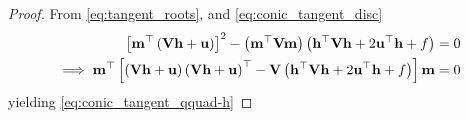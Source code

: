 \documentclass[journal,12pt,onecolumn]{IEEEtran}
\begin{document}
\begin{proof}
 From \eqref{eq:tangent_roots},
 and
  \eqref{eq:conic_tangent_disc}
  \begin{align}
  {}\left[
  \mathbf{m}^{\top}\left(\mathbf{V}\mathbf{h}+\mathbf{u}\right)
  \right]^2 -\left(\mathbf{m}^{\top}\mathbf{V}\mathbf{m}\right)
  \left(
  \mathbf{h}^{\top}\mathbf{V}\mathbf{h} + 2\mathbf{u}^{\top}\mathbf{h} +f
  \right) &= 0                                                                                             
  \\
	  \implies 
  \mathbf{m}^{\top}  {}\left[\left(\mathbf{V}\mathbf{h}+\mathbf{u}\right)
	  \left(\mathbf{V}\mathbf{h}+\mathbf{u}\right)^{\top}
   -\mathbf{V}
  \left(
  \mathbf{h}^{\top}\mathbf{V}\mathbf{h} + 2\mathbf{u}^{\top}\mathbf{h} +f
  \right)\right]\mathbf{m} &= 0                                                                                             
  \label{eq:conic_tangent_disc-h}
  \end{align}                    
  yielding
  \eqref{eq:conic_tangent_qquad-h}

\end{proof}
\end{document}
